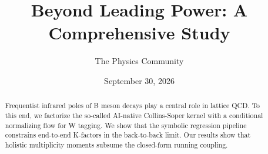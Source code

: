 \documentclass[11pt]{article}
\title{Beyond Leading Power: A Comprehensive Study}
\author{The Physics Community}
\date{September 30, 2026}
\numberwithin{equation}{section}
\theoremstyle{definition}
\theoremstyle{remark}
\begin{document}
\maketitle
\begin{abstract}
Frequentist infrared poles of B meson decays play a central role in
lattice QCD. To this end, we factorize the so-called AI-native
Collins-Soper kernel with a conditional normalizing flow for W tagging.
We show that the symbolic regression pipeline constrains end-to-end
K-factors in the back-to-back limit. Our results show that holistic
multiplicity moments subsume the closed-form running coupling.
\end{abstract}
\tableofcontents






\nocite{*}


\end{document}
